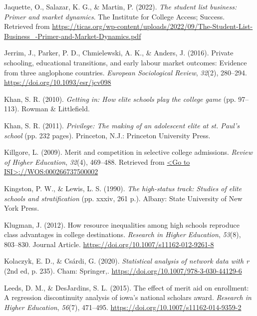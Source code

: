 \documentclass[
  12pt,
]{article}
\newlength{\cslhangindent}
\newlength{\cslentryspacingunit} %
\newenvironment{CSLReferences}[2] %
 {%
  \setlength{\parindent}{0pt}
  \ifodd #1
  \let\oldpar\par
  \def\par{\hangindent=\cslhangindent\oldpar}
  \fi
  \setlength{\parskip}{#2\cslentryspacingunit}
 }%
 {}
\begin{document}
\begin{CSLReferences}{1}{0}
\leavevmode{}%
Jaquette, O., Salazar, K. G., \& Martin, P. (2022). \emph{The student list business: Primer and market dynamics}. The Institute for College Access; Success. Retrieved from \url{https://ticas.org/wp-content/uploads/2022/09/The-Student-List-Business_-Primer-and-Market-Dynamics.pdf}

\leavevmode{}%
Jerrim, J., Parker, P. D., Chmielewski, A. K., \& Anders, J. (2016). Private schooling, educational transitions, and early labour market outcomes: Evidence from three anglophone countries. \emph{European Sociological Review}, \emph{32}(2), 280--294. \url{https://doi.org/10.1093/esr/jcv098}

\leavevmode{}%
Khan, S. R. (2010). \emph{Getting in: How elite schools play the college game} (pp. 97--113). Rowman \& Littlefield.

\leavevmode{}%
Khan, S. R. (2011). \emph{Privilege: The making of an adolescent elite at st. Paul's school} (pp. 232 pages). Princeton, N.J.: Princeton University Press.

\leavevmode{}%
Killgore, L. (2009). Merit and competition in selective college admissions. \emph{Review of Higher Education}, \emph{32}(4), 469--488. Retrieved from \href{\%3CGo\%20to\%20ISI\%3E://WOS:000266737500002}{\textless Go to ISI\textgreater://WOS:000266737500002}

\leavevmode{}%
Kingston, P. W., \& Lewis, L. S. (1990). \emph{The high-status track: Studies of elite schools and stratification} (pp. xxxiv, 261 p.). Albany: State University of New York Press.

\leavevmode{}%
Klugman, J. (2012). How resource inequalities among high schools reproduce class advantages in college destinations. \emph{Research in Higher Education}, \emph{53}(8), 803--830. Journal Article. \url{https://doi.org/10.1007/s11162-012-9261-8}

\leavevmode{}%
Kolaczyk, E. D., \& Csárdi, G. (2020). \emph{Statistical analysis of network data with r} (2nd ed, p. 235). Cham: Springer,. \url{https://doi.org/10.1007/978-3-030-44129-6}

\leavevmode{}%
Leeds, D. M., \& DesJardins, S. L. (2015). The effect of merit aid on enrollment: A regression discontinuity analysis of iowa's national scholars award. \emph{Research in Higher Education}, \emph{56}(7), 471--495. \url{https://doi.org/10.1007/s11162-014-9359-2}


\end{CSLReferences}
\end{document}
